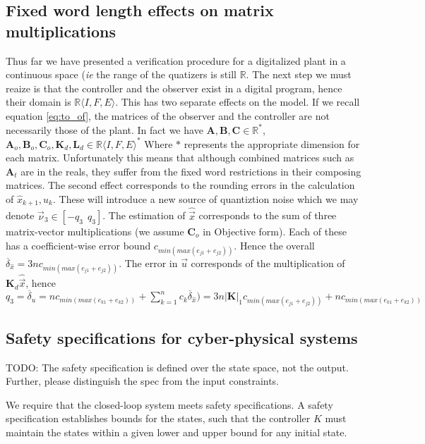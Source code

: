 \documentclass[runningheads,a4paper]{llncs}
\newcommand{\todo}[1]{{\color{red} TODO: #1}}
\newcommand{\mat}[1]{\boldsymbol{#1}}
\begin{document}
\subsection{Fixed word length effects on matrix multiplications}
\label{sec:cof_fwl}
Thus far we have presented a verification procedure for a digitalized plant in a continuous space (\emph{ie} the
range of the quatizers is still $\mathbb{R}$. The next step we must reaize is that the controller and the observer
exist in a digital program, hence their domain is $\mathbb{R}\langle I,F,E\rangle$. This has two separate effects
on the model. If we recall equation \eqref{eq:to_of}, the matrices of the observer and the controller  are not necessarily those of the plant.
In fact we have $\mat{A},\mat{B},\mat{C} \in \mathbb{R}^*$, $\mat{A}_o,\mat{B}_o,\mat{C}_o, \mat{K}_d, \mat{L}_d \in \mathbb{R}\langle I,F,E\rangle^*$
Where $*$ represents the appropriate dimension for each matrix.
Unfortunately this means that although combined matrices such as $\mat{A}_t$ are in the reals, they suffer from
the fixed word restrictions in their composing matrices.
The second effect corresponds to the rounding errors in the calculation of $\hat{x}_{k+1}, u_k$. These will introduce a new source of quantiztion noise which we may denote $\vec{\nu}_3 \in [-q_3\ \ q_3]$.
The estimation of $\hat{\vec{x}}$ corresponds to the sum of three matrix-vector multiplications (we assume $\mat{C}_o$ in Objective form). Each of these has a coefficient-wise error bound $c_{min(max(e_{j1}+e_{j2}))}$. Hence the overall $\overline{\delta}_{\hat{x}}=3nc_{min(max(e_{j1}+e_{j2}))}$. The error in $\vec{u}$ corresponds of the multiplication of $\mat{K}_d\hat{\vec{x}}$, hence $q_3=\overline{\delta}_u=nc_{min(max(e_{k1}+e_{k2}))}+\sum_{k=1}^nc_k\overline{\delta}_{\hat{x}})=3n|\mat{K}|_1c_{min(max(e_{j1}+e_{j2}))}+nc_{min(max(e_{k1}+e_{k2}))}$


\subsection{Safety specifications for cyber-physical systems}
\label{ssec:safety}

\todo{The safety specification is defined over the state space, not the output. Further, please distinguish the spec from the input constraints. }

We require that the closed-loop system meets safety specifications. 
A safety specification establishes bounds for the states, such that 
the controller $K$ must maintain the states within a given lower and upper 
bound for any initial state. 
\end{document}
